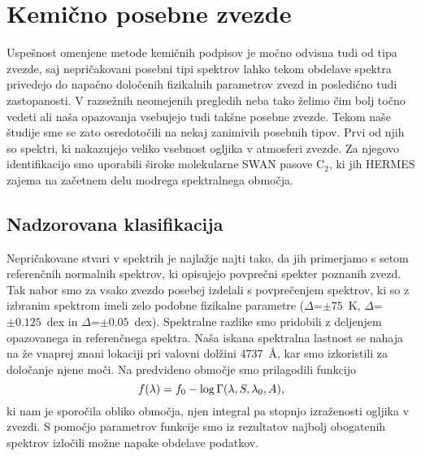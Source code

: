 \section{Kemično posebne zvezde}
\label{sec:slo_c_peculiars}
Uspešnost omenjene metode kemičnih podpisov je močno odvisna tudi od tipa zvezde, saj nepričakovani posebni tipi spektrov lahko tekom obdelave spektra privedejo do napačno določenih fizikalnih parametrov zvezd in posledično tudi zastopanosti. V razsežnih neomejenih pregledih neba tako želimo čim bolj točno vedeti ali naša opazovanja vsebujejo tudi takšne posebne zvezde. Tekom naše študije sme se zato osredotočili na nekaj zanimivih posebnih tipov. Prvi od njih so spektri, ki nakazujejo veliko vsebnost ogljika v atmosferi zvezde. Za njegovo identifikacijo smo uporabili široke molekularne SWAN pasove C$_{2}$, ki jih HERMES zajema na začetnem delu modrega spektralnega območja. 

\subsection{Nadzorovana klasifikacija}
Nepričakovane stvari v spektrih je najlažje najti tako, da jih primerjamo s setom referenčnih normalnih spektrov, ki opisujejo povprečni spekter poznanih zvezd. Tak nabor smo za vsako zvezdo posebej izdelali s povprečenjem spektrov, ki so z izbranim spektrom imeli zelo podobne fizikalne parametre ($\Delta$\Teff=$\pm75$~K, $\Delta$\Logg=$\pm0.125$~dex in $\Delta$\Feh=$\pm0.05$~dex). Spektralne razlike smo pridobili z deljenjem opazovanega in referenčnega spektra. Naša iskana spektralna lastnost se nahaja na že vnaprej znani lokaciji pri valovni dolžini 4737~\AA, kar smo izkoristili za določanje njene moči. Na predvideno območje smo prilagodili funkcijo
\begin{equation}
\centering
f(\lambda) = f_0 - \log{}\Gamma(\lambda, S, \lambda_0, A),
\label{equ:slo_loggamma}
\end{equation}
ki nam je sporočila obliko območja, njen integral pa stopnjo izraženosti ogljika v zvezdi. S pomočjo parametrov funkcije smo iz rezultatov najbolj obogatenih spektrov izločili možne napake obdelave podatkov.

